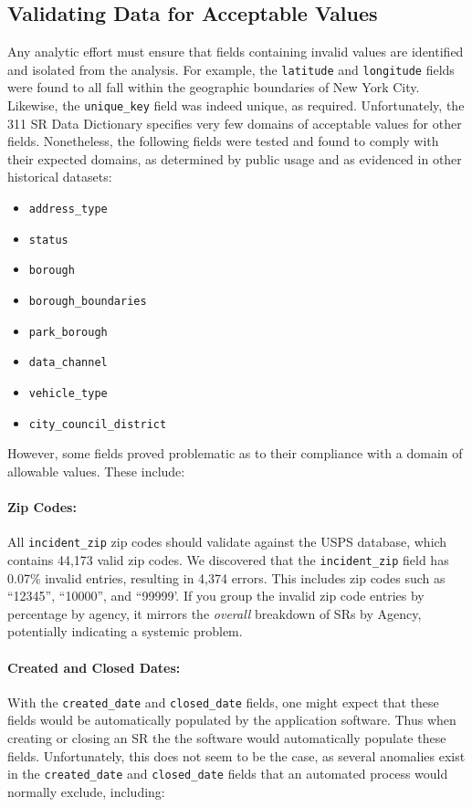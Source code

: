 \documentclass[linenumber]{jdsart}
\begin{document}
\subsection{Validating Data for Acceptable Values}
\label{sec:domain}
Any analytic effort must ensure that fields containing invalid values 
are identified and isolated from the analysis. For example, the \texttt{latitude} 
and \texttt{longitude} fields were found to all fall within the 
geographic boundaries of New York City. Likewise, 
the \texttt{unique\_key} field was indeed unique, as required. 
Unfortunately, the 311 SR Data Dictionary specifies very few domains
of acceptable values for other fields. Nonetheless, the following
fields were tested and found to comply with their expected
domains, as determined by public
usage and as evidenced in other historical datasets:

\begin{itemize}[left=1.5em]
    \item \texttt{address\_type}
    \item \texttt{status}
    \item \texttt{borough}
    \item \texttt{borough\_boundaries}
    \item \texttt{park\_borough}
    \item \texttt{data\_channel}
    \item \texttt{vehicle\_type}
    \item \texttt{city\_council\_district}
\end{itemize}

However,  some fields proved problematic as to their 
compliance with a domain of allowable values. These include: 

\paragraph{Zip Codes:}
\label{sec:zipcodesissues}
All \texttt{incident\_zip} zip codes should 
validate against the USPS database, which contains 
44,173 valid zip codes. We discovered that the \texttt{incident\_zip} 
field has 0.07\% invalid entries, resulting in 4,374 errors. This includes
zip codes such as ``12345'', ``10000'', and ``99999'. If you group 
the invalid zip code entries by percentage by agency, it 
mirrors the \textit{overall} breakdown of SRs by Agency, potentially 
indicating a systemic problem.


\paragraph{Created and Closed Dates:}
\label{sec:negativeduration}
With the \texttt{created\_date} and \texttt{closed\_date} fields, one 
might expect that these fields would be automatically populated by the  
application software. Thus when creating  or closing an SR 
the the software would automatically populate these fields. 
Unfortunately, this does not seem to be the case, as several anomalies 
exist in the \texttt{created\_date} and \texttt{closed\_date} fields that
an automated process would normally exclude, including:
\end{document}
